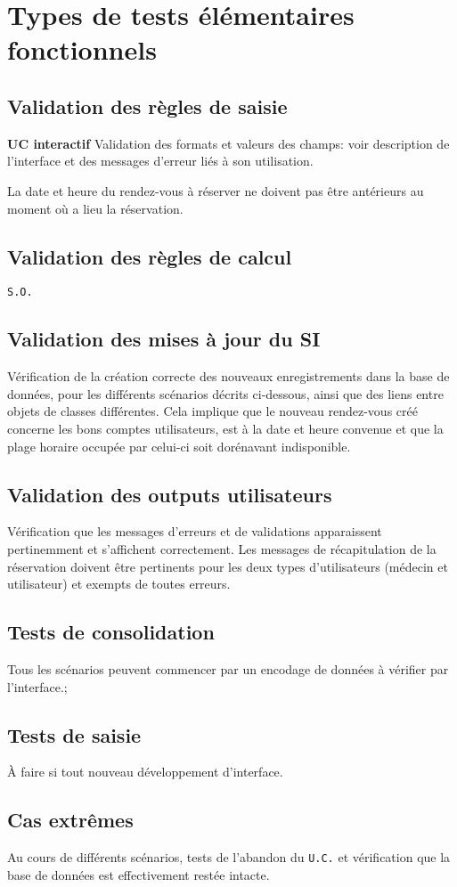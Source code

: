 	\section{Types de tests élémentaires fonctionnels}
	\subsection{Validation des règles de saisie}
	\textbf{UC interactif}
	Validation des formats et valeurs des champs: voir description de l’interface et
	des messages d’erreur liés à son utilisation.

	La date et heure du rendez-vous à réserver ne doivent pas être antérieurs au
	moment où a lieu la réservation. 
	\subsection{Validation des règles de calcul}
	\texttt{S.O.}
	\subsection{Validation des mises à jour du SI}
	Vérification de la création correcte des nouveaux enregistrements dans la base
	de données, pour les différents scénarios décrits ci-dessous, ainsi que des
	liens entre objets de classes différentes. 
	Cela implique que le nouveau rendez-vous créé concerne les bons comptes
	utilisateurs, est à la date et heure convenue et que la plage horaire occupée
	par celui-ci soit dorénavant indisponible.
	\subsection{Validation des outputs utilisateurs}
	Vérification que les messages d’erreurs et de validations apparaissent
	pertinemment et s’affichent correctement. Les messages de récapitulation de la
	réservation doivent être pertinents pour les deux types d’utilisateurs (médecin
	et utilisateur) et exempts de toutes erreurs.
	\subsection{Tests de consolidation}
	Tous les scénarios peuvent commencer par un encodage de données à 
	vérifier par l’interface.;
	\subsection{Tests de saisie}
	À faire si tout nouveau développement d’interface.
	\subsection{Cas extrêmes}
	Au cours de différents scénarios, tests de l'abandon du \texttt{U.C.} et vérification que
	la base de données est effectivement restée intacte.

